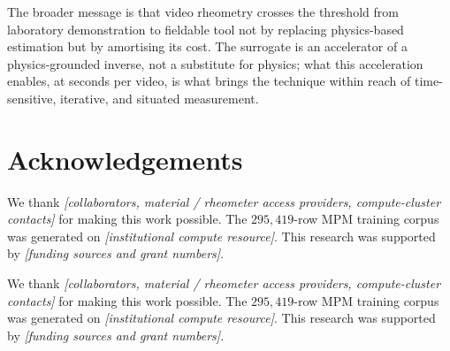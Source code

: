 The broader message is that video rheometry crosses the threshold
from laboratory demonstration to fieldable tool not by replacing
physics-based estimation but by amortising its cost. The surrogate
is an accelerator of a physics-grounded inverse, not a substitute
for physics; what this acceleration enables, at seconds per video,
is what brings the technique within reach of time-sensitive,
iterative, and situated measurement.


\section*{Acknowledgements}
We thank
\textit{[collaborators, material / rheometer access providers,
compute-cluster contacts]}
for making this work possible. The $295{,}419$-row MPM training
corpus was generated on
\textit{[institutional compute resource]}.
This research was supported by
\textit{[funding sources and grant numbers]}.

\begin{acks}
We thank
\textit{[collaborators, material / rheometer access providers,
compute-cluster contacts]}
for making this work possible. The $295{,}419$-row MPM training
corpus was generated on
\textit{[institutional compute resource]}.
This research was supported by
\textit{[funding sources and grant numbers]}.
\end{acks}





